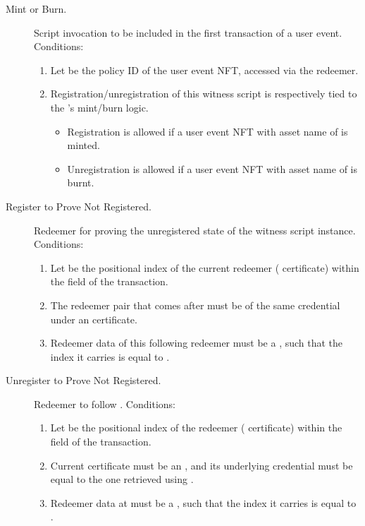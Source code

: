 \documentclass[../midgard.tex]{subfiles}
\begin{document}
\begin{description}
  \item[Mint or Burn.] Script invocation to be included in the first transaction of a user event.
    Conditions:
      \begin{enumerate}
          \item Let  be the policy ID of the user event NFT, accessed via the redeemer.
          \item Registration/unregistration of this witness script is respectively tied to the 's mint/burn logic. 
              \begin{itemize}
                  \item Registration is allowed if a user event NFT with asset name of  is minted.
                  \item Unregistration is allowed if a user event NFT with asset name of  is burnt.
              \end{itemize}
      \end{enumerate}
  \item[Register to Prove Not Registered.] Redeemer for proving the unregistered state of the witness script instance.
    Conditions:
      \begin{enumerate}
          \item Let  be the positional index of the current redeemer ( certificate) within the  field of the transaction.
          \item The redeemer pair that comes after  must be of the same credential under an  certificate.
          \item Redeemer data of this following redeemer must be a , such that the index it carries is equal to .
      \end{enumerate}
  \item[Unregister to Prove Not Registered.] Redeemer to follow .
    Conditions:
      \begin{enumerate}
          \item Let  be the positional index of the  redeemer ( certificate) within the  field of the transaction.
          \item Current certificate must be an , and its underlying credential must be equal to the one retrieved using .
          \item Redeemer data at  must be a , such that the index it carries is equal to .
      \end{enumerate}
\end{description}
\end{document}
